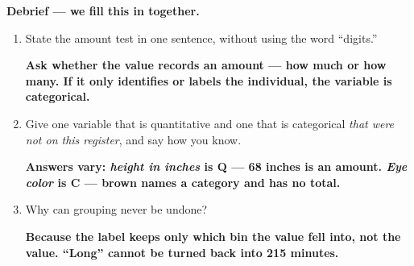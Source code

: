\documentclass[10pt]{article}
\newcommand{\answerspace}[2]{\par\nopagebreak\noindent\begin{minipage}[t][#1][t]{\linewidth}%
  \color{keyred}\bfseries #2\end{minipage}\par}
\begin{document}
\boxguard[18]
\begin{reflectionbox}
\small
\textbf{Debrief --- we fill this in together.}
\begin{enumerate}[leftmargin=1.9em, itemsep=6pt]
  \item State the amount test in one sentence, without using the word ``digits.''
        \answerspace{1.0cm}{Ask whether the value records an amount --- how much or how many.
        If it only identifies or labels the individual, the variable is categorical.}
  \item Give one variable that is quantitative and one that is categorical \emph{that were not
        on this register}, and say how you know.
        \answerspace{1.2cm}{Answers vary: \emph{height in inches} is Q --- 68 inches is an amount.
        \emph{Eye color} is C --- brown names a category and has no total.}
  \item Why can grouping never be undone?
        \answerspace{1.0cm}{Because the label keeps only which bin the value fell into, not the
        value. ``Long'' cannot be turned back into 215 minutes.}
\end{enumerate}
\end{reflectionbox}
\end{document}

